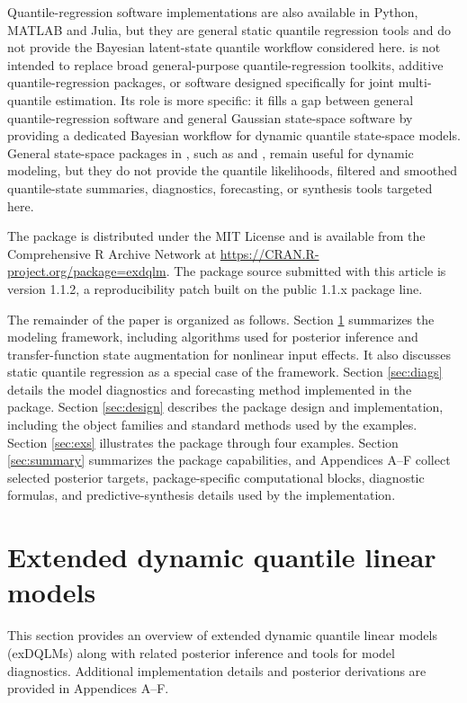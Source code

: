 \documentclass{jss}
\begin{document}
Quantile-regression software implementations are also available in Python, MATLAB and Julia, but they are general static quantile regression tools and do not provide the Bayesian latent-state quantile workflow considered here.
 is not intended to replace broad general-purpose quantile-regression toolkits, additive quantile-regression packages, or software designed specifically for joint multi-quantile estimation. Its role is more specific: it fills a gap between general quantile-regression software and general Gaussian state-space software by providing a dedicated Bayesian workflow for dynamic quantile state-space models. General state-space packages in , such as  \citep{dlm} and  \citep{dynr}, remain useful for dynamic modeling, but they do not provide the quantile likelihoods, filtered and smoothed quantile-state summaries, diagnostics, forecasting, or synthesis tools targeted here.

The  package is distributed under the MIT License and is available from the Comprehensive R Archive Network at \url{https://CRAN.R-project.org/package=exdqlm}. The package source submitted with this article is version 1.1.2, a reproducibility patch built on the public 1.1.x package line.

The remainder of the paper is organized as follows. Section \ref{sec:exdqlm} summarizes the modeling framework, including algorithms used for posterior inference and transfer-function state augmentation for nonlinear input effects. It also discusses static quantile regression as a special case of the framework. Section \ref{sec:diags} details the model diagnostics and forecasting method implemented in the package. Section \ref{sec:design} describes the package design and implementation, including the object families and standard methods used by the examples. Section \ref{sec:exs} illustrates the package through four examples. Section \ref{sec:summary} summarizes the package capabilities, and Appendices A--F collect selected posterior targets, package-specific computational blocks, diagnostic formulas, and predictive-synthesis details used by the implementation.



\section{Extended dynamic quantile linear models}
\label{sec:exdqlm}
This section provides an overview of extended dynamic quantile linear models (exDQLMs) along with related posterior inference and tools for model diagnostics. Additional implementation details and posterior derivations are provided in Appendices A--F.
\end{document}

